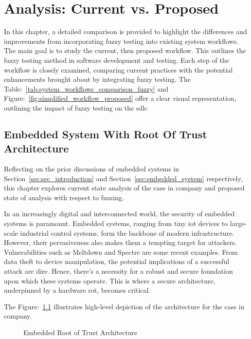 \vspace{21.5pt}
\chapter{Analysis: Current vs. Proposed}
In this chapter, a detailed comparison is provided to highlight the differences
and improvements from incorporating fuzzy testing into existing system workflows.
The main goal is to study the current, then proposed workflow. This outlines the
fuzzy testing method in software development and testing. Each step of the workflow
is closely examined, comparing current practices with the potential enhancements
brought about by integrating fuzzy testing. The Table:~\ref{tab:system_workflows_comparison_fuzzy}
and Figure:~\ref{fig:simplified_workflow_proposed} offer a clear visual representation,
outlining the impact of fuzzy testing on the \acrlong{sdlc}

\section{Embedded System With Root Of Trust Architecture}
Reflecting on the prior discussions of embedded systems in
Section~\ref{sec:sec_introduction} and Section~\ref{sec:embedded_system} respectively,
this chapter explores current state analysis of the case in company and proposed
state of analysis with respect to fuzzing.

In an increasingly digital and interconnected world, the security of
embedded systems is paramount. Embedded systems, ranging from tiny
\gls{iot} devices to large-scale industrial control
systems, form the backbone of modern infrastructure. However,
their pervasiveness also makes them a tempting target for attackers. Vulnerabilities such as
Meltdown\cite{lipp2020meltdown} and Spectre\cite{kocher2020spectre} are some recent examples.
From data theft to device manipulation, the potential implications of
a successful attack are dire. Hence, there's a necessity for a robust
and secure foundation upon which these systems operate. This is where a secure architecture,
underpinned by a hardware \gls{rot}, becomes critical\cite{Introduc7:online}.

The Figure:~\ref{fig:rot} illustrates high-level depiction of the architecture for
the case in company.

\begin{figure}[H]
    \centering
    \caption{Embedded Root of Trust Architecture\cite{Introduc82:online}}\label{fig:rot}
\end{figure}



